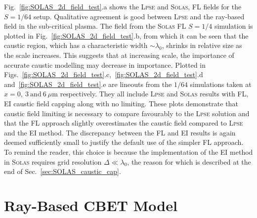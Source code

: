 Fig.~\ref{fig:SOLAS_2d_field_test}.a shows the \textsc{Lpse} and \textsc{Solas}, \ac{FL} fields for the $S=1/64$ setup.
Qualitative agreement is good between \textsc{Lpse} and the ray-based field in the sub-critical plasma.
The field from the \textsc{Solas} \ac{FL} $S=1/4$ simulation is plotted in Fig.~\ref{fig:SOLAS_2d_field_test}.b, from which it can be seen that the caustic region, which has a characteristic width $\sim\lambda_0$, shrinks in relative size as the scale increases.
This suggests that at increasing scale, the importance of accurate caustic modelling may decrease in importance.
Plotted in Figs.~\ref{fig:SOLAS_2d_field_test}.c,~\ref{fig:SOLAS_2d_field_test}.d and~\ref{fig:SOLAS_2d_field_test}.e are lineouts from the $1/64$ simulations taken at $x=0,\ 3\ \text{and}\ 6\ \mu\text{m}$ respectively.
They all include \textsc{Lpse} and \textsc{Solas} results with \ac{FL}, \ac{EI} caustic field capping along with no limiting.
These plots demonstrate that caustic field limiting is necessary to compare favourably to the \textsc{Lpse} solution and that the \ac{FL} approach slightly overestimates the caustic field compared to \textsc{Lpse} and the \ac{EI} method.
The discrepancy between the \ac{FL} and \ac{EI} results is again deemed sufficiently small to justify the default use of the simpler \ac{FL} approach.
To remind the reader, this choice is because the implementation of the \ac{EI} method in \textsc{Solas} requires grid resolution $\Delta\ll\lambda_0$, the reason for which is described at the end of Sec.~\ref{sec:SOLAS_caustic_cap}.

\section{Ray-Based CBET Model}
\label{sec:SOLAS_cbet_model}

